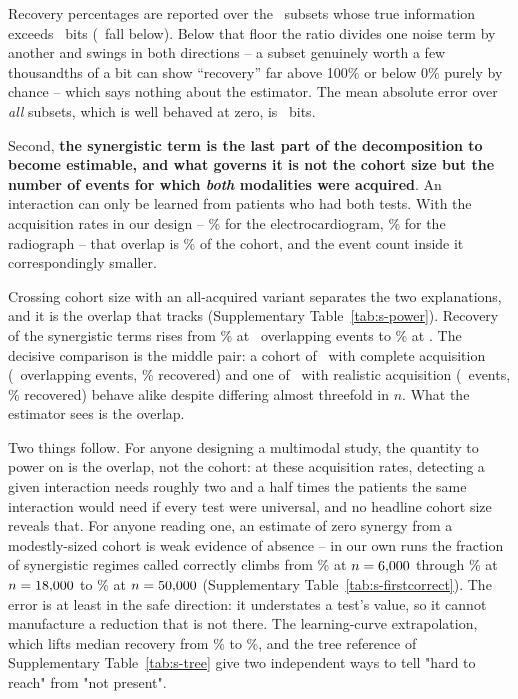\documentclass[11pt]{article}
\theoremstyle{definition}
\theoremstyle{remark}
\begin{document}
Recovery percentages are reported over the \simSubsetsScored\ subsets whose true
information exceeds \simRecoveryFloor\ bits (\simSubsetsBelowFloor\ fall below).
Below that floor the ratio divides one noise term by another and swings in both
directions -- a subset genuinely worth a few thousandths of a bit can show ``recovery''
far above 100\% or below 0\% purely by chance -- which says nothing about the
estimator. The mean absolute error
over \emph{all} subsets, which is well behaved at zero, is
\simMeanAbsErr\ bits.

Second, \textbf{the synergistic term is the last part of the decomposition to
become estimable, and what governs it is not the cohort size but the number of
events for which \emph{both} modalities were acquired}. An interaction can only
be learned from patients who had both tests. With the acquisition rates in our
design -- \acqEcg\% for the electrocardiogram, \acqCxr\% for the radiograph --
that overlap
is \powBothFrac\% of the cohort, and the event count inside it correspondingly
smaller.

Crossing cohort size with an all-acquired variant separates the two
explanations, and it is the overlap that tracks (Supplementary Table~\ref{tab:s-power}).
Recovery of the synergistic terms rises from \powSynMin\% at \powEventsMin\
overlapping events to \powSynMax\% at \powEventsMax. The decisive comparison is
the middle pair: a cohort of \powMidAN\ with complete acquisition
(\powMidAEvents\ overlapping events, \powMidARecovery\% recovered) and one of
\powMidBN\ with realistic acquisition (\powMidBEvents\ events,
\powMidBRecovery\% recovered) behave alike despite differing almost threefold
in $n$. What the estimator sees is the overlap.

Two things follow. For anyone designing a multimodal study, the quantity to
power on is the overlap, not the cohort: at these acquisition rates, detecting a
given interaction needs roughly two and a half times the patients the same
interaction would need if every test were universal, and no headline cohort size
reveals that. For anyone reading one, an estimate of zero synergy from a
modestly-sized cohort is weak evidence of absence -- in our own runs the
fraction of synergistic regimes called correctly climbs from
\regimeSynSmall\% at $n=6{,}000$ through \regimeSynMid\% at
$n=18{,}000$ to \regimeSynLarge\% at $n=50{,}000$
(Supplementary Table~\ref{tab:s-firstcorrect}). The error is at least in the safe direction: it
understates a test's value, so it cannot manufacture a reduction that is not
there. The learning-curve extrapolation, which lifts median recovery from
\simRecovery\% to \simRecoveryCorrected\%, and the tree reference of
Supplementary Table~\ref{tab:s-tree} give two independent ways to tell "hard to reach" from
"not present".
\end{document}
